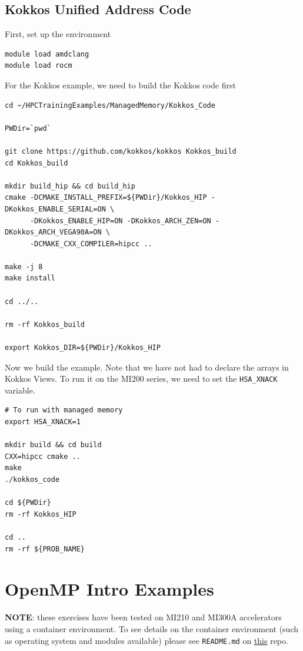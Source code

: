 \documentclass[
]{article}
\let\oldtexttt\texttt
\renewcommand{\texttt}[1]{
  \colorbox{Light}{\oldtexttt{#1}}
}
\begin{document}
\hypertarget{kokkos-unified-address-code}{%
\subsection{Kokkos Unified Address
Code}\label{kokkos-unified-address-code}}

First, set up the environment

\begin{verbatim}
module load amdclang
module load rocm
\end{verbatim}

For the Kokkos example, we need to build the Kokkos code first

\begin{verbatim}
cd ~/HPCTrainingExamples/ManagedMemory/Kokkos_Code

PWDir=`pwd`

git clone https://github.com/kokkos/kokkos Kokkos_build
cd Kokkos_build

mkdir build_hip && cd build_hip
cmake -DCMAKE_INSTALL_PREFIX=${PWDir}/Kokkos_HIP -DKokkos_ENABLE_SERIAL=ON \
      -DKokkos_ENABLE_HIP=ON -DKokkos_ARCH_ZEN=ON -DKokkos_ARCH_VEGA90A=ON \
      -DCMAKE_CXX_COMPILER=hipcc ..

make -j 8
make install

cd ../..

rm -rf Kokkos_build

export Kokkos_DIR=${PWDir}/Kokkos_HIP
\end{verbatim}

Now we build the example. Note that we have not had to declare the
arrays in Kokkos Views. To run it on the MI200 series, we need to set
the \texttt{HSA\_XNACK} variable.

\begin{verbatim}
# To run with managed memory
export HSA_XNACK=1

mkdir build && cd build
CXX=hipcc cmake ..
make
./kokkos_code

cd ${PWDir}
rm -rf Kokkos_HIP

cd ..
rm -rf ${PROB_NAME}
\end{verbatim}

\pagebreak

\hypertarget{openmp-intro-examples}{%
\section{OpenMP Intro Examples}\label{openmp-intro-examples}}

\textbf{NOTE}: these exercises have been tested on MI210 and MI300A
accelerators using a container environment. To see details on the
container environment (such as operating system and modules available)
please see \texttt{README.md} on
\href{https://github.com/amd/HPCTrainingDock}{this} repo.
\end{document}
